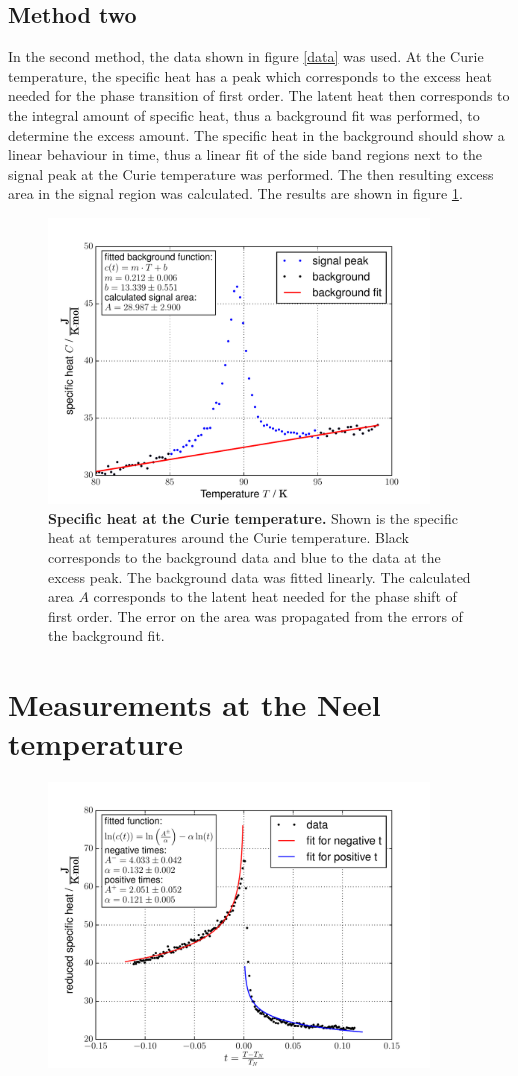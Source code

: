 \documentclass{include/thesisclass3}
\begin{document}
\subsection{Method two}
In the second method, the data shown in figure \ref{data} was used. 
At the Curie temperature, the specific heat has a peak which corresponds to the excess heat needed for the phase transition of first order.
The latent heat then corresponds to the integral amount of specific heat, thus a background fit was performed, to determine the excess amount.
The specific heat in the background should show a linear behaviour in time, thus a linear fit of the side band regions next to the signal peak at the Curie temperature was performed.
The then resulting excess area in the signal region was calculated.
The results are shown in figure \ref{area}.
\begin{figure}[H]
\includegraphics[width = 0.9\textwidth]{fig/latentheat_area.pdf}
\caption{\label{area}\textbf{Specific heat at the Curie temperature.} Shown is the specific heat at temperatures around the Curie temperature. Black corresponds to the background data and blue to the data at the excess peak. The background data was fitted linearly. The calculated area $A$ corresponds to the latent heat needed for the phase shift of first order. The error on the area was propagated from the errors of the background fit.}

\end{figure}


\section{Measurements at the Neel temperature}




\begin{figure}[H]
\includegraphics[width = 0.9\textwidth]{fig/loglogfit.pdf}
\end{figure}
\end{document}
